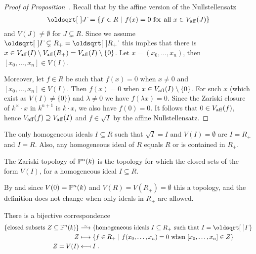 \documentclass[a4paper,parskip=half,numbers=enddot, DIV=12, headheight=30pt]{scrreprt}
\begin{document}
\begin{proof}[Proof of Proposition~]
    Recall that by the affine version of the Nullstellensatz
    \begin{align*}
        \sqrt{J} = \left\{f\in R\st f(x) = 0 \text{ for all } x\in V_\aff(J)\right\}
    \end{align*}
    and $V(J)\neq \emptyset$ for $J\subsetneq R$. Since we assume $\sqrt{I}\subsetneq R_+ = \sqrt{R\smash{_+}}$ this implies that there is $x\in V_{\mathrm{aff}}(I)\setminus V_{\mathrm{aff}}(R_+) = V_{\mathrm{aff}}(I)\setminus\{0\}$. Let $x=(x_0,\ldots, x_n)$, then $[x_0,\ldots,x_n]\in V(I)$. 
    
    Moreover, let $f\in R$ be such that $f(x) = 0$ when $x\neq 0$ and $[x_0,\ldots, x_n]\in V(I)$. Then $f(x)=0$ when $x\in V_{\mathrm{aff}}(I)\setminus\{0\}$. For such $x$ (which exist as $V(I)\neq \{0\}$) and $\lambda\neq 0$ we have $f(\lambda x) = 0$. Since the Zariski closure of $k^\times \cdot x$ in $k^{n+1}$ is $k\cdot x$, we also have $f(0)=0$. It follows that $0\in V_{\mathrm{aff}}(f)$, hence $V_{\mathrm{aff}}(f)\supseteq V_{\mathrm{aff}}(I)$ and $f\in \sqrt{I}$ by the affine Nullstellensatz.
\end{proof}
\begin{rem*}
    The only homogeneous ideals $I\subseteq R$ such that $\sqrt{I}=I$ and $V(I)=\emptyset$ are $I=R_+$ and $I=R$. Also, any homogeneous ideal of $R$ equals $R$ or is contained in $R_+$.
\end{rem*}
\begin{defi}[Topology on $\IP^n(k)$]
    The Zariski topology of $\IP^n(k)$ is the topology for which the closed sets of the form $V(I)$, for a homogeneous ideal $I\subseteq R$.
\end{defi}
\begin{rem*}
    By  and since $V(0)= \mathbb{P}^n(k)$ and $V(R) = V(R_+) =\emptyset$ this a topology, and the definition does not change when only ideals in $R_+$ are allowed.
\end{rem*}
\begin{prop}
There is a bijective correspondence
\begin{align*}
\left\{\text{closed subsets }Z\subseteq\IP^n(k)\right\}&\isomorphism\left\{\text{homogeneous ideals }I\subseteq R_+\text{ such that }I=\sqrt{I}\right\}\\
Z &\longmapsto \left\{f\in R_+ \st f(x_0,\ldots,x_n) = 0\text{ when } [x_0,\ldots,x_n]\in Z\right\}\\
Z=V(I) &\longmapsfrom I\;.
\end{align*}
\end{prop}
\end{document}
